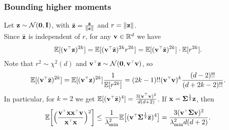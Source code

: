 \documentclass[10pt]{beamer}
\begin{document}
\begin{frame}
  \frametitle{Bounding higher moments}
  Let $\mathbf z\sim\mathcal{N}(\mathbf 0,\mathbf I)$, with $\bar{\mathbf z}=\frac{\mathbf z}{\|\mathbf z\|}$ and
  $r=\|\mathbf z\|$.\\
  Since $\bar{\mathbf z}$ is independent of $r$, for any $\mathbf v\in\mathbb R^d$ we have
  \begin{align*}
\E[(\v^\top\z)^{2k}] = \E[(\v^\top\bar\z)^{2k}r^{2k}] =
    \E[(\v^\top\bar\z)^{2k}]\cdot \E[r^{2k}].
  \end{align*}
  Note that $r^2\sim\chi^2(d)$ and
  $\v^\top\z\sim\Nc(\zero,\v^\top\v)$, so
  \begin{align*}
    \E[(\v^\top\bar\z)^{2k}] = \E[(\v^\top\z)^{2k}]\frac1{\E[r^{2k}]}
    = (2k-1)!! (\v^\top\v)^k\frac{(d-2)!!}{(d+2k-2)!!}.
  \end{align*}
  In particular, for $k=2$ we get
  $\E[(\v^\top\bar\z)^4]=\frac{3(\v^\top\v)^2}{d(d+2)}$. If
  $\mathbf x=\mathbf{\Sigma}^{\frac12}\mathbf z$, then
  \begin{align*}
    \E\bigg[\Big(\frac{\v^\top\x\x^\top\v}{\x^\top\x}\Big)^2\bigg]\leq
    \frac1{\lambda_{\min}^2}\E\big[(\v^\top\Sigmab^{\frac12}\bar\z)^4\big]
    =\frac{3(\v^\top\Sigmab\v)^2}{\lambda_{\min}^2d(d+2)}.
  \end{align*}
\end{frame}
\end{document}
